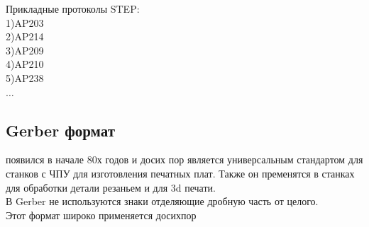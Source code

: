 \documentclass[a4paper, 12pt]{article}
\begin{document}
Прикладные протоколы STEP:\\
1)AP203\\
2)AP214\\
3)AP209\\
4)AP210\\
5)AP238\\
$\ldots $\\

\subsection{Gerber формат} 
появился в начале 80х годов и досих пор является универсальным стандартом для станков с ЧПУ для изготовления печатных плат. Также он пременятся в станках для обработки детали резаньем и для 3d печати.\\
В Gerber не используются знаки отделяющие дробную часть от целого.\\
Этот формат широко применяется досихпор
\end{document}
